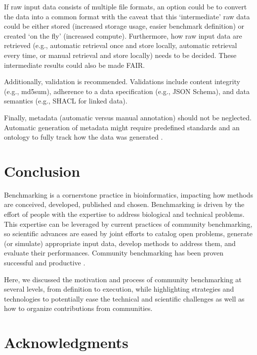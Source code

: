 \documentclass[11pt]{article}
\begin{document}
If raw input data consists of multiple file formats, an option could be to convert the data into a common format with the caveat that this `intermediate' raw data could be either stored (increased storage usage, easier benchmark definition) or created `on the fly' (increased compute). Furthermore, how raw input data are retrieved (e.g., automatic retrieval once and store locally, automatic retrieval every time, or manual retrieval and store locally) needs to be decided. These intermediate results could also be made FAIR.

Additionally, validation is recommended. Validations include content integrity (e.g., md5sum), adherence to a data specification (e.g., JSON Schema), and data semantics (e.g., SHACL for linked data). 

Finally, metadata (automatic versus manual annotation) should not be neglected. Automatic generation of metadata might require predefined standards and an ontology to fully track how the data was generated \cite{LeboUnknown-om}. 

\section*{Conclusion}
\label{sec:conclusion}

Benchmarking is a cornerstone practice in bioinformatics, impacting how methods are conceived, developed, published and chosen. Benchmarking is driven by the effort of people with the expertise to address biological and technical problems. This expertise can be leveraged by current practices of community benchmarking, so scientific advances are eased by joint efforts to catalog open problems, generate (or simulate) appropriate input data, develop methods to address them, and evaluate their performances. Community benchmarking has been proven successful and  productive \cite{moult2005-ne,Capella-Gutierrez2017-dh,luecken2025open}.

Here, we discussed the motivation and process of community benchmarking at several levels, from definition to execution, while highlighting strategies and technologies to potentially ease the technical and scientific challenges as well as how to organize contributions from communities. 


\section*{Acknowledgments} 
\end{document}
